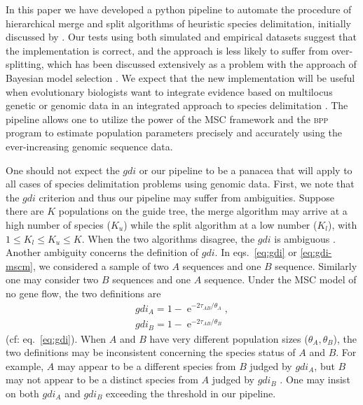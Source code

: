 \documentclass{article1}
\DeclareMathOperator{\e}{\mathrm{e}}
\begin{document}
In this paper we have developed a python pipeline to automate the procedure of
hierarchical merge and split algorithms of heuristic species delimitation, initially
discussed by \citet{Leache2019}.  Our tests using both simulated and empirical datasets
suggest that the implementation is correct, and the approach is less likely to suffer
from over-splitting, which has been discussed extensively as a problem with the approach
of Bayesian model selection \citep{Yang2010}.  We expect that the new implementation
will be useful when evolutionary biologists want to integrate evidence based on
multilocus genetic or genomic data in an integrated approach to species delimitation
\citep{Fujita2012}.  The pipeline allows one to utilize the power of the MSC framework
and the \textsc{bpp} program to estimate population parameters precisely and accurately
using the ever-increasing genomic sequence data.

One should not expect the $gdi$ or our pipeline to be a panacea that will apply to all
cases of species delimitation problems using genomic data. First, we note that the $gdi$
criterion and thus our pipeline may suffer from ambiguities.  Suppose there are $K$
populations on the guide tree, the merge algorithm may arrive at a high number of
species ($K_u$) while the split algorithm at a low number ($K_l$), with $1 \le K_l \le
K_u \le K$.  When the two algorithms disagree, the $gdi$ is ambiguous
\citep{Jackson2017}.   Another ambiguity concerns the definition of $gdi$.  In
eqs.~\ref{eq:gdi} or \ref{eq:gdi-mscm}, we considered a sample of two $A$ sequences and
one $B$ sequence.  Similarly one may consider two $B$ sequences and one $A$ sequence.
Under the MSC model of no gene flow, the two definitions are
\begin{equation}
   \begin{aligned}
      gdi_A = 1 - \e^{-2\tau _{AB}/\theta_A} , \\
      gdi_B = 1 - \e^{-2\tau _{AB}/\theta_B}
   \end{aligned}
\end{equation}
(cf: eq.~\ref{eq:gdi}).  When $A$ and $B$ have very different population sizes
($\theta_A, \theta_B$), the two definitions may be inconsistent concerning the species
status of $A$ and $B$.  For example, $A$ may appear to be a different species from $B$
judged by $gdi_A$, but $B$ may not appear to be a distinct species from $A$ judged by
$gdi_B$ \citep{Leache2019}.  One may insist on both $gdi_A$ and $gdi_B$ exceeding the
threshold in our pipeline.
\end{document}
